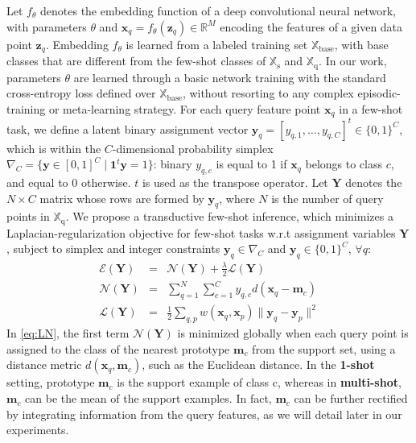 \documentclass{article}
\newcommand{\yy}{{\mathbf y}}
\newcommand{\ftheta}{f_{\theta}}
\newcommand{\xx}{\mathbf x}
\newcommand{\Ncal}{\mathcal{N}}
\newcommand{\Ecal}{\mathcal{E}}
\newcommand{\Lcal}{\mathcal{L}}
\newcommand{\xxq}{\mathbf{x}}
\newcommand{\zz}{\mathbf{z}}
\newcommand{\XXb}{\mathbb{X}_{\text{base}}}
\newcommand{\XXs}{\mathbb{X}_{\text{s}}}
\newcommand{\XXq}{\mathbb{X}_{\text{q}}}
\newcommand{\YY}{\mathbf Y}
\newcommand{\mm}{{\mathbf m}}
\begin{document}
Let $\ftheta$ denotes the embedding function of a deep convolutional neural network, with parameters $\theta$ and $\xx_q=\ftheta(\zz_q) \in \mathbb{R}^M$ encoding the features of a given data point $\zz_q$. Embedding $\ftheta$ is learned from a labeled training set $\XXb$, with  
base classes
that are different from 
the few-shot classes of $\XXs$ and $\XXq$.
In our work, parameters $\theta$ are learned through a basic network training with the standard cross-entropy loss defined over $\XXb$, without resorting to any complex episodic-training or meta-learning strategy. For each query feature point $\xxq_{q}$ in a few-shot task, we define a latent binary assignment vector $\yy_q = [y_{q,1}, \dots, y_{q,C}]^t \in\{0,1\}^C$, which is within the $C$-dimensional probability simplex $\nabla_C = \{\yy \in [0, 1]^C \; | \; {\mathbf 1}^t \yy = 1 \}$: binary $y_{q,c}$ is equal to 1 if $\xxq_q$ belongs to class $c$, and equal to 0 otherwise. $t$ is used as the transpose operator. Let $\YY$ denotes the $N \times C$ matrix whose rows are formed by $\yy_q$, where $N$ is the number of query points in $\XXq$. We propose a transductive few-shot inference, which minimizes a Laplacian-regularization objective for few-shot tasks w.r.t assignment variables $\YY$, subject to simplex and integer constraints $\yy_q \in \nabla_C$ and $\yy_q \in\{0,1\}^C$, $\forall q$:  
\begin{eqnarray}
\label{eq:LN}
{\Ecal}(\YY)  & = & {\Ncal(\YY)} + \frac{\lambda}{2} {\Lcal(\YY)} \\
{\Ncal(\YY)} & = & \sum_{q=1}^{N} \sum_{c=1}^C y_{q,c} d(\xxq_q - \mm_c) \nonumber\\
{\Lcal(\YY)} & = & \frac{1}{2} \sum_{q,p} w (\xxq_q, \xxq_p) \|\yy_q - \yy_p\|^2 \nonumber 
\end{eqnarray}
In \eqref{eq:LN}, the first term $\Ncal(\YY)$ is minimized globally when each query point is assigned to the class of the nearest prototype $\mm_c$ from the support set, using a distance metric $d(\xxq_q,\mm_c)$, such as the Euclidean distance. In the \textbf{1-shot} setting, prototype $\mm_c$ is the support example of class c, whereas in \textbf{multi-shot}, $\mm_c$ can be the  mean of the support examples. In fact, $\mm_c$ can be further rectified 
by integrating information from the query features, as we will detail later in our experiments. 
\end{document}
